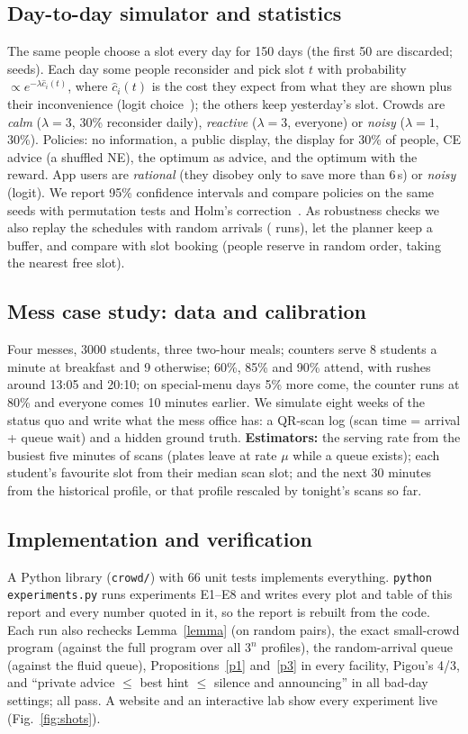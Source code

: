 \documentclass{article}
\begin{document}
\subsection{Day-to-day simulator and statistics}
The same people choose a slot every day for 150 days (the first 50 are discarded; \Rseeds{} seeds). Each day some
people reconsider and pick slot $t$ with probability $\propto e^{-\lambda\hat c_i(t)}$, where $\hat c_i(t)$ is the
cost they expect from what they are shown plus their inconvenience (logit choice~\cite{mckelvey}); the others keep
yesterday's slot. Crowds are \emph{calm} ($\lambda=3$, 30\% reconsider daily), \emph{reactive} ($\lambda=3$,
everyone) or \emph{noisy} ($\lambda=1$, 30\%). Policies: no information, a public display, the display for 30\% of
people, CE advice (a shuffled NE), the optimum as advice, and the optimum with the reward. App users are
\emph{rational} (they disobey only to save more than 6\,s) or \emph{noisy} (logit). We report 95\% confidence
intervals and compare policies on the same seeds with permutation tests and Holm's correction~\cite{holm}. As
robustness checks we also replay the schedules with random arrivals (\RqueueRuns{} runs), let the planner keep a buffer,
and compare with slot booking (people reserve in random order, taking the nearest free slot).

\subsection{Mess case study: data and calibration}
Four messes, 3000 students, three two-hour meals; counters serve 8 students a minute at breakfast and 9 otherwise;
60\%, 85\% and 90\% attend, with rushes around 13:05 and 20:10; on special-menu days 5\% more come, the counter runs
at 80\% and everyone comes 10 minutes earlier. We simulate eight weeks of the status quo and write what the mess
office has: a QR-scan log (scan time = arrival + queue wait) and a hidden ground truth. \textbf{Estimators:} the
serving rate from the busiest five minutes of scans (plates leave at rate $\mu$ while a queue exists); each student's
favourite slot from their median scan slot; and the next 30 minutes from the historical profile, or that profile
rescaled by tonight's scans so far.


\subsection{Implementation and verification}\label{sec:impl}
A Python library (\texttt{crowd/}) with 66 unit tests implements everything. \texttt{python experiments.py} runs
experiments E1--E8 and writes every plot and table of this report and every number quoted in it, so the report is
rebuilt from the code. Each run also rechecks Lemma~\ref{lemma} (on \RmonoN{} random pairs), the exact small-crowd
program (against the full program over all $3^n$ profiles), the random-arrival queue (against the fluid queue),
Propositions~\ref{p1} and~\ref{p3} in every facility, Pigou's 4/3, and ``private advice $\le$ best hint $\le$ silence
and announcing'' in all \RbadSettings{} bad-day settings; all pass. A website and an interactive lab show every
experiment live (Fig.~\ref{fig:shots}).
\end{document}
